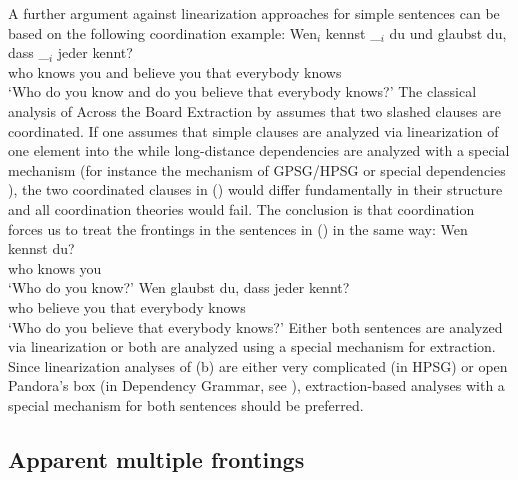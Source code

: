 A further argument against linearization approaches for simple sentences can be based on the following coordination
example:
\ea
\gll Wen$_i$ kennst \_$_i$ du  und glaubst du, dass \_$_i$ jeder kennt?\\
     who     knows  {} you and believe you that {} everybody  knows\\
\glt `Who do you know and do you believe that everybody knows?'
\z
The classical analysis of Across the Board Extraction by
\citet{Gazdar81} assumes that two slashed clauses are coordinated. If one assumes that simple
clauses are analyzed via linearization of one element into the \vf while long-distance dependencies
are analyzed with a special mechanism (for instance the \slasch mechanism of GPSG/HPSG or special
dependencies ), the two coordinated clauses in () would differ
fundamentally in their structure and all coordination theories would fail. The conclusion is that
coordination forces us to treat the frontings in the sentences in () in the same way:
\eal
\ex
\gll Wen kennst du?\\
     who     knows  you\\
\glt `Who do you know?'
\ex
\gll Wen glaubst du, dass jeder kennt?\\
     who     believe you that everybody knows\\
\glt `Who do you believe that everybody knows?'
\zl
Either both sentences are analyzed via linearization or both are analyzed using a special
mechanism for extraction. Since linearization analyses of (b) are either very complicated
(in HPSG) or open Pandora's box (in Dependency Grammar, see \citealp[Section~11.7.1]{MuellerGT-Eng1}), extraction-based
analyses with a special mechanism for both sentences should be preferred.


\subsection{Apparent multiple frontings}

